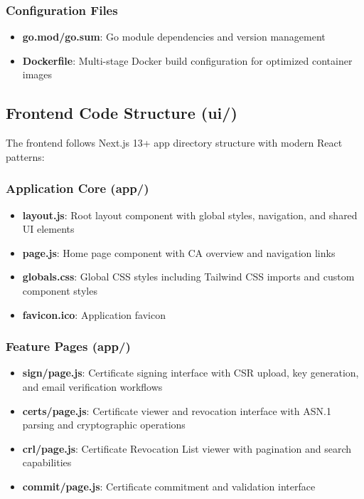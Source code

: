 \subsubsection{Configuration Files}

\begin{itemize}
    \item \textbf{go.mod/go.sum}: Go module dependencies and version management
    \item \textbf{Dockerfile}: Multi-stage Docker build configuration for optimized container images
\end{itemize}

\subsection{Frontend Code Structure (ui/)}

The frontend follows Next.js 13+ app directory structure with modern React patterns:

\subsubsection{Application Core (app/)}

\begin{itemize}
    \item \textbf{layout.js}: Root layout component with global styles, navigation, and shared UI elements
    \item \textbf{page.js}: Home page component with CA overview and navigation links
    \item \textbf{globals.css}: Global CSS styles including Tailwind CSS imports and custom component styles
    \item \textbf{favicon.ico}: Application favicon
\end{itemize}

\subsubsection{Feature Pages (app/)}

\begin{itemize}
    \item \textbf{sign/page.js}: Certificate signing interface with CSR upload, key generation, and email verification workflows
    \item \textbf{certs/page.js}: Certificate viewer and revocation interface with ASN.1 parsing and cryptographic operations
    \item \textbf{crl/page.js}: Certificate Revocation List viewer with pagination and search capabilities
    \item \textbf{commit/page.js}: Certificate commitment and validation interface
\end{itemize}

